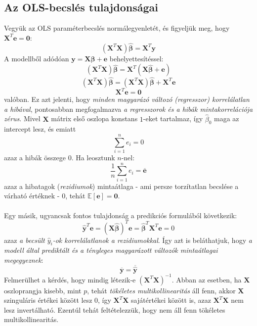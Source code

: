 \documentclass[14p]{report}
\def\pmb{\boldsymbol}
\def\ebeta{\hat{\pmb{\beta}}}
\def\bar{\overline}
\begin{document}
	\subsection{Az OLS-becslés tulajdonságai}
	Vegyük az OLS paraméterbecslés normálegyenletét, és figyeljük meg, hogy $\pmb{X}^T\pmb{e} = \pmb{0}$:
	\[
	(\pmb{X}^T\pmb{X})\ebeta = \pmb{X}^T\pmb{y}
	\]
	A modellből adódóan $\pmb{y} = \pmb{X}\ebeta + \pmb{e}$ behelyettesítéssel:
	\[
	(\pmb{X}^T\pmb{X})\ebeta = \pmb{X}^T(\pmb{X}\ebeta + \pmb{e})
	\]
	\[
	(\pmb{X}^T\pmb{X})\ebeta = (\pmb{X}^T\pmb{X})\ebeta + \pmb{X}^T\pmb{e}
	\]
	\[
	\pmb{X}^T\pmb{e} = \pmb{0}
	\]
	valóban. Ez azt jelenti, hogy \emph{minden magyarázó változó (regresszor) korrelálatlan a hibával}, pontosabban megfogalmazva \emph{a regresszorok és a hibák mintakorrelációja zérus}. Mivel $\pmb{X}$ mátrix első oszlopa konstans $1$-eket tartalmaz, így $\hat{\beta}_0$ maga az intercept lesz, és emiatt 
	\[
	\sum_{i=1}^{n}e_i = 0
	\]
	azaz a hibák összege $0$. Ha leosztunk $n$-nel:
	\[
	\frac{1}{n}\sum_{i=1}^{n}e_i = \bar{\pmb{e}}
	\]
	azaz a hibatagok (\emph{rezidiumok}) mintaátlaga - ami persze torzítatlan becslése a várható értéknek - $0$, tehát $\mathbb{E}[\pmb{e}] = \pmb{0}$.
	\\
	\\
	Egy másik, ugyancsak fontos tulajdonság a predikciós formulából következik:
	\[
	\hat{\pmb{y}}^T\pmb{e} = (\pmb{X}\ebeta)^T\pmb{e} = \ebeta^T\pmb{X}^T\pmb{e} = 0
	\]
	azaz \emph{a becsült $\hat{y}_i$-ok korrelálatlanok a rezidiumokkal}. Így azt is beláthatjuk, hogy \emph{a modell által prediktált és a tényleges magyarázott változók mintaátlagai megegyeznek}:
	\[
	\bar{\pmb{y}} = \bar{\hat{\pmb{y}}}
	\]
	Felmerülhet a kérdés, hogy mindig létezik-e $(\pmb{X}^T\pmb{X})^{-1}$. Abban az esetben, ha $\pmb{X}$ oszloprangja kisebb, mint $p$, tehát \emph{tökéletes multikollinearitás} áll fenn, akkor $\pmb{X}$ szinguláris értékei között lesz $0$, így $\pmb{X}^T\pmb{X}$ sajátértékei között is, azaz $\pmb{X}^T\pmb{X}$ nem lesz invertálható. Ezentúl tehát feltételezzük, hogy nem áll fenn tökéletes multikollinearitás.
	
\end{document}
